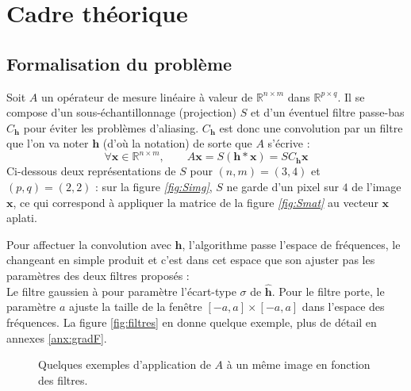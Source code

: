 \documentclass[hidelinks, french]{article} %
\newcommand{\R}{\mathbb{R}}
\renewcommand{\bf}[1]{\boldsymbol{#1}}
\theoremstyle{enonce}
\theoremstyle{special}
\theoremstyle{rq}
\theoremstyle{exo}
\theoremstyle{demo}
\begin{document}
\section{Cadre théorique}\label{sec:cadre theo}


\subsection{Formalisation du problème}\label{sec:forma2pb}

Soit $A$ un opérateur de mesure linéaire à valeur de $\R^{n\times m}$ dans $\R^{p\times q}$. Il se compose d'un sous-échantillonnage (projection) $S$ et d'un éventuel filtre passe-bas $C_{\bf{h}}$ pour éviter les problèmes d'aliasing. $C_{\bf{h}}$ est donc une convolution par un filtre que l'on va noter $\bf{h}$ (d'où la notation) de sorte que $A$ s'écrive :
\[\forall \bf{x}\in\R^{n\times m},\qquad A\bf{x}=S(\bf{h}*\bf{x})=SC_{\bf{h}}\bf{x}\]
Ci-dessous deux représentations de $S$ pour $(n,m)=(3, 4)$ et $(p,q)=(2, 2)$ : sur la figure \textit{\ref{fig:Simg}}, $S$ ne garde d'un pixel sur $4$ de l'image $\bf{x}$, ce qui correspond à appliquer la matrice de la figure \textit{\ref{fig:Smat}} au vecteur $\bf{x}$ aplati.

Pour affectuer la convolution avec $\bf{h}$, l'algorithme passe l'espace de fréquences, le changeant en simple produit et c'est dans cet espace que son ajuster pas les paramètres des deux filtres proposés :
\\
Le filtre gaussien à pour paramètre l'écart-type $\sigma$ de $\hat{\bf{h}}$. Pour le filtre porte, le paramètre $a$ ajuste la taille de la fenêtre $[-a,a]\times[-a,a]$ dans l'espace des fréquences. La figure \ref{fig:filtres} en donne quelque exemple, plus de détail en annexes \ref{anx:gradF}.
\\

\begin{figure}[b]
\begin{floatrow}
{%
}

{%
}
\end{floatrow}
\end{figure}

\begin{figure}[h]\centering
    \caption{Quelques exemples d'application de $A$ à un même image en fonction des filtres. }
\end{figure}
\end{document}
